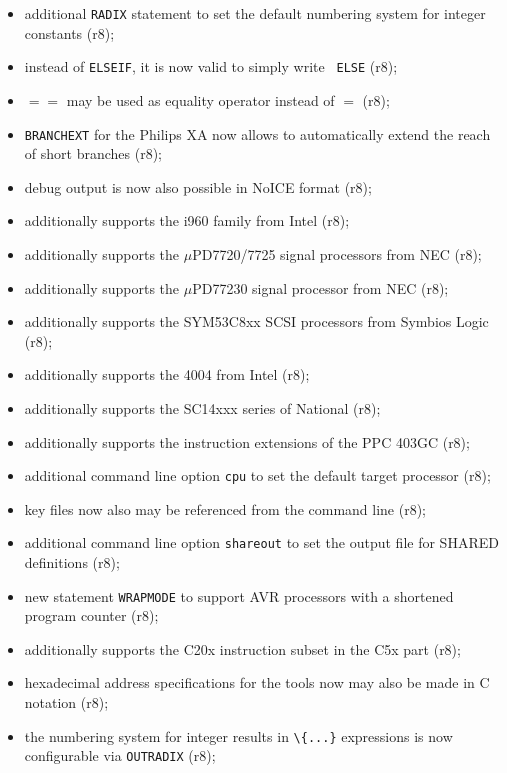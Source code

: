 \documentclass[12pt,twoside]{report}
\newcommand{\tty}[1]{{\tt #1}}
\begin{document}
\begin{itemize}
{\begin{itemize}
      \item{additional \tty{RADIX} statement to set the default numbering
            system for integer constants (r8);}
      \item{instead of {\tt ELSEIF}, it is now valid to simply write {\tt
            ELSE} (r8);}
      \item{$==$ may be used as equality operator instead of $=$ (r8);}
      \item{\tty{BRANCHEXT} for the Philips XA now allows to automatically
            extend the reach of short branches (r8);}
      \item{debug output is now also possible in NoICE format (r8);}
      \item{additionally supports the i960 family from Intel (r8);}
      \item{additionally supports the $\mu$PD7720/7725 signal processors
            from NEC (r8);}
      \item{additionally supports the $\mu$PD77230 signal processor from
            NEC (r8);}
      \item{additionally supports the SYM53C8xx SCSI processors from
            Symbios Logic (r8);}
      \item{additionally supports the 4004 from Intel (r8);}
      \item{additionally supports the SC14xxx series of National (r8);}
      \item{additionally supports the instruction extensions of the PPC
            403GC (r8);}
      \item{additional command line option {\tt cpu} to set the default
            target processor (r8);}
      \item{key files now also may be referenced from the command line
            (r8);}
      \item{additional command line option {\tt shareout} to set the
            output file for SHARED definitions (r8);}
      \item{new statement {\tt WRAPMODE} to support AVR processors with
            a shortened program counter (r8);}
      \item{additionally supports the C20x instruction subset in the C5x
            part (r8);}
      \item{hexadecimal address specifications for the tools now may also
            be made in C notation (r8);}
      \item{the numbering system for integer results in \verb!\{...}!
            expressions is now configurable via \tty{OUTRADIX} (r8);}

\end{itemize}}
\end{itemize}
\end{document}
